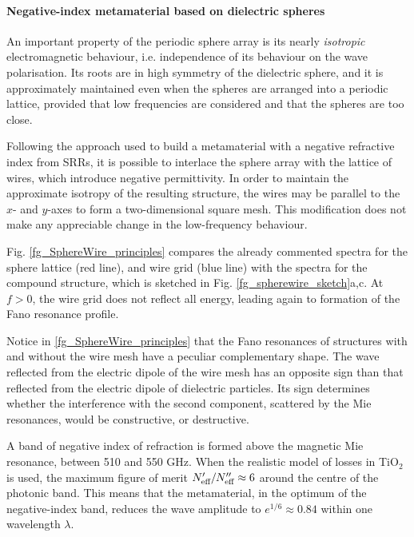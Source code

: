 \paragraph{Negative-index metamaterial based on dielectric spheres} %
An important property of the periodic sphere array is its nearly \textit{isotropic} electromagnetic behaviour, i.e. independence of its behaviour on the wave polarisation. Its roots are in high symmetry of the dielectric sphere, and it is approximately maintained even when the spheres are arranged into a periodic lattice, provided that low frequencies are considered and that the spheres are too close. 

Following the approach used to build a metamaterial with a negative refractive index from SRRs, it is possible to interlace the sphere array with the lattice of wires, which introduce negative permittivity. In order to maintain the approximate isotropy of the resulting structure, the wires may be parallel to the $x$- and $y$-axes to form a two-dimensional square mesh. This modification does not make any appreciable change in the low-frequency behaviour. %

Fig. \ref{fg_SphereWire_principles} compares the already commented spectra for the sphere lattice (red line), and wire grid (blue line) with the spectra for the compound structure, which is sketched in Fig. \ref{fg_spherewire_sketch}a,c. At $f>0$, the wire grid does not reflect all energy, leading again to formation of the Fano resonance profile. 

Notice in \ref{fg_SphereWire_principles} that the Fano resonances of structures with and without the wire mesh have a peculiar complementary shape. The wave reflected from the electric dipole of the wire mesh has an opposite sign than that reflected from the electric dipole of dielectric particles. Its sign determines whether the interference with the second component, scattered by the Mie resonances, would be constructive, or destructive. 

A band of negative index of refraction is formed above the magnetic Mie resonance, between 510 and 550 GHz. When the realistic model of losses in TiO$_2$ is used, the maximum figure of merit $N_{\text{eff} }'/N_{\text{eff} }'' \approx 6$ around the centre of the photonic band. This means that the metamaterial, in the optimum of the negative-index band, reduces the wave amplitude to $e^{1/6} \approx 0.84$ within one wavelength $\lambda$. 

